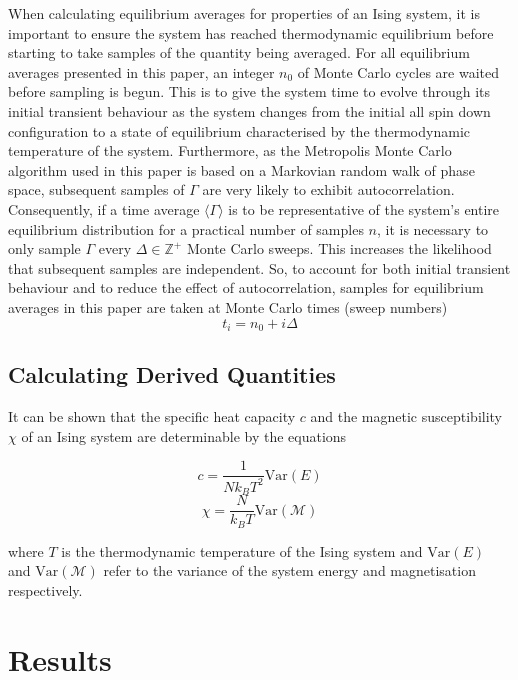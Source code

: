 \documentclass[11pt]{iopart}
\begin{document}
When calculating equilibrium averages for properties of an Ising system, it is important to ensure the system has reached thermodynamic equilibrium before starting to take samples of the quantity being averaged. For all equilibrium averages presented in this paper, an integer $n_0$ of Monte Carlo cycles are waited before sampling is begun. This is to give the system time to evolve through its initial transient behaviour as the system changes from the initial all spin down configuration to a state of equilibrium characterised by the thermodynamic temperature of the system. Furthermore, as the Metropolis Monte Carlo algorithm used in this paper is based on a Markovian random walk of phase space, subsequent samples of $\Gamma$ are very likely to exhibit autocorrelation. Consequently, if a time average $\langle \Gamma \rangle$ is to be representative of the system's entire equilibrium distribution for a practical number of samples $n$, it is necessary to only sample $\Gamma$ every $\Delta \in \mathbb{Z}^{+}$ Monte Carlo sweeps. This increases the likelihood that subsequent samples are independent. So, to account for both initial transient behaviour and to reduce the effect of autocorrelation, samples for equilibrium averages in this paper are taken at Monte Carlo times (sweep numbers)
\begin{equation}
\label{eq:samples}
t_i = n_0 + i \Delta
\end{equation}  

\subsection{Calculating Derived Quantities}

It can be shown that the specific heat capacity $c$ and the magnetic susceptibility $\chi$ of an Ising system are determinable by the equations \cite{handout}
\begin{multicols}{2}
\begin{equation}
c = \frac{1}{N k_B T^2} \textrm{Var}(E)
\end{equation}
\begin{equation}
\chi = \frac{N}{k_B T} \textrm{Var}({\mathcal{M}})
\end{equation}
\end{multicols}where $T$ is the thermodynamic temperature of the Ising system and $\textrm{Var}(E)$ and $\textrm{Var}(\mathcal{M})$ refer to the variance of the system energy and magnetisation respectively.

\section{Results}
\end{document}

